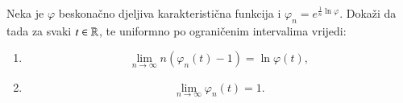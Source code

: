 \begin{zad} \label{zad:18.12}
    Neka je $\varphi$ beskona\v cno djeljiva karakteristi\v cna funkcija i $\varphi_n = e^{\frac{1}{n} \ln \varphi}$.
    Doka\v zi da tada za svaki $t \in \mathbb{R}$, te uniformno po ograni\v cenim intervalima vrijedi:
    \begin{enumerate}[label=(\alph*)]
        \item    \label{zad:18.12.1}
        \begin{equation*}
            \lim\limits_{n \to \infty} n (\varphi_n (t) - 1) = \ln \varphi (t),
        \end{equation*}
        \item   \label{zad:18.12.2}
        \begin{equation*}
            \lim\limits_{n \to \infty} \varphi_n (t) = 1.
        \end{equation*}
    \end{enumerate}
\end{zad}